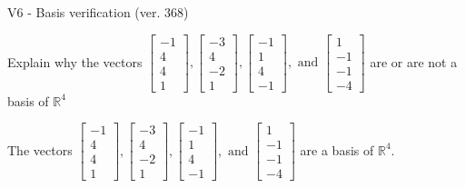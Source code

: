 \begin{exercise}
  \begin{exerciseTitle}V6 - Basis verification (ver. 368)\end{exerciseTitle}
  \begin{exerciseStatement}
    Explain why the vectors \(\left[\begin{array}{r}
-1 \\
4 \\
4 \\
1
\end{array}\right] , \left[\begin{array}{r}
-3 \\
4 \\
-2 \\
1
\end{array}\right] , \left[\begin{array}{r}
-1 \\
1 \\
4 \\
-1
\end{array}\right] , \text{ and } \left[\begin{array}{r}
1 \\
-1 \\
-1 \\
-4
\end{array}\right]\) are or are not a basis of \(\mathbb{R}^4\)	


  \end{exerciseStatement}
  \begin{exerciseAnswer}
   The vectors \(\left[\begin{array}{r}
-1 \\
4 \\
4 \\
1
\end{array}\right] , \left[\begin{array}{r}
-3 \\
4 \\
-2 \\
1
\end{array}\right] , \left[\begin{array}{r}
-1 \\
1 \\
4 \\
-1
\end{array}\right] , \text{ and } \left[\begin{array}{r}
1 \\
-1 \\
-1 \\
-4
\end{array}\right]\) 
  	 are  a basis of \(\mathbb{R}^4\).
  


  \end{exerciseAnswer}
\end{exercise}